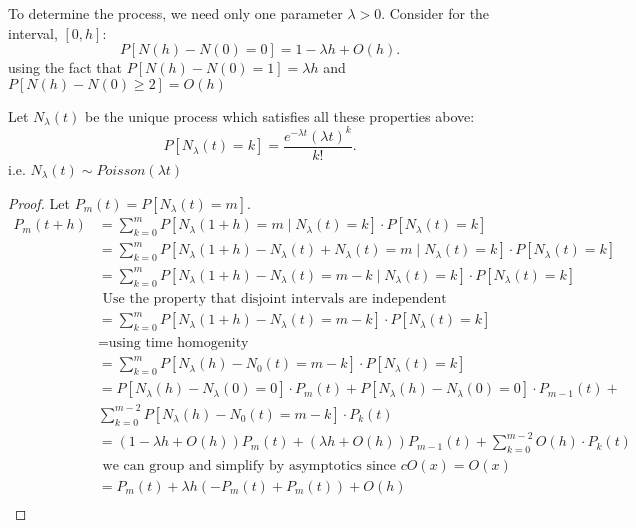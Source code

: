\documentclass[a4paper]{article}
\begin{document}
To determine the process, we need only one parameter $\lambda > 0$. Consider for the interval, $[0,h]$:
 \[
   P[N(h) - N(0) = 0] = 1 - \lambda h + O(h)
.\] 
using the fact that $P[N(h) - N(0) = 1] = \lambda h $ and  $P[N(h) - N(0) \geq 2] = O(h)$

\begin{theorem}
  Let $N_{\lambda}(t)$ be the unique process which satisfies all these properties above:
  \[
    P[N_{\lambda} (t) = k] = \frac{e^{-\lambda t} (\lambda t)^{k}}{k!}
  .\] 
  i.e. $N_{\lambda}(t) \sim Poisson(\lambda t)$

\end{theorem}
  \noindent\hrulefill

  \begin{proof}
    Let $P_m (t) = P[N_{\lambda}(t) = m]$. 
    \begin{align*}
      P_m (t+ h) &= \sum_{k = 0}^{m} P[N_{\lambda} (1+ h) = m \mid N_{\lambda}(t) = k] \cdot P[N_{\lambda} (t) = k] \\
                 &= \sum_{k = 0}^{m} P[N_{\lambda} (1+ h) - N_{\lambda} (t) + N_{\lambda} (t) = m \mid N_{\lambda}(t) = k] \cdot P[N_{\lambda} (t) = k]   \\
                 &= \sum_{k = 0}^{m} P[N_{\lambda} (1+ h) - N_{\lambda } (t) = m  - k \mid N_{\lambda}(t) = k] \cdot P[N_{\lambda} (t) = k]  \\
                 &\text{ Use the property that disjoint intervals are independent}  \\
                 &= \sum_{k = 0}^{m} P[N_{\lambda} (1+ h) - N_{\lambda } (t) = m  - k] \cdot P[N_{\lambda} (t) = k]   \\
                 &= \text{using time homogenity} \\
                 &=  \sum_{k=0}^{m} P[N_{\lambda} (h) - N_{0} (t) = m  - k] \cdot P[N_{\lambda} (t) = k]   \\
                 &=  P[N_{\lambda}(h) - N_{\lambda}(0) = 0 ] \cdot P_{m}(t) + P[N_{\lambda}(h) - N_{\lambda}(0) = 0 ] \cdot P_{m-1}(t) + \\
                 &\sum_{k=0}^{m-2} P[N_{\lambda} (h) - N_{0} (t) = m  - k] \cdot P_k (t)  \\
                 &= (1- \lambda h + O(h)) P_{m} (t) + (\lambda h + O(h)) P_{m-1} (t)  + \sum_{k=0}^{m-2} O(h) \cdot P_{k} (t) \\
                 &\text{ we can group and simplify by asymptotics since $cO(x) = O(x)$ } \\
                 &= P_{m}(t) + \lambda h \left(   -P_{m}(t) + P_{m}(t) \right) + O(h) \\

\end{align*}
\end{proof}
\end{document}
